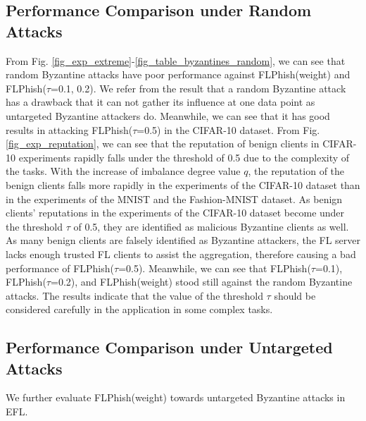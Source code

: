 \documentclass[journal]{IEEEtran}
\begin{document}
  \subsection{Performance Comparison under Random Attacks}
  From Fig. \ref{fig_exp_extreme}-\ref{fig_table_byzantines_random}, we can see that random Byzantine attacks have poor performance against FLPhish(weight) and FLPhish($\tau$=0.1, 0.2). We refer from the result that a random Byzantine attack has a drawback that it can not gather its influence at one data point as untargeted Byzantine attackers do. Meanwhile, we can see that it has good results in attacking FLPhish($\tau$=0.5) in the CIFAR-10 dataset. From Fig. \ref{fig_exp_reputation}, we can see that the reputation of benign clients in CIFAR-10 experiments rapidly falls under the threshold of 0.5 due to the complexity of the tasks. With the increase of imbalance degree value $q$, the reputation of the benign clients falls more rapidly in the experiments of the CIFAR-10 dataset than in the experiments of the MNIST and the Fashion-MNIST dataset. As benign clients' reputations in the experiments of the CIFAR-10 dataset become under the threshold $\tau$ of 0.5, they are identified as malicious Byzantine clients as well. As many benign clients are falsely identified as Byzantine attackers, the FL server lacks enough trusted FL clients to assist the aggregation, therefore causing a bad performance of FLPhish($\tau$=0.5). Meanwhile, we can see that FLPhish($\tau$=0.1), FLPhish($\tau$=0.2), and FLPhish(weight) stood still against the random Byzantine attacks. The results indicate that the value of the threshold $\tau$ should be considered carefully in the application in some complex tasks.








  \subsection{{Performance Comparison under Untargeted Attacks}} We further evaluate FLPhish(weight) towards untargeted Byzantine attacks in EFL.
  

  
\end{document}
